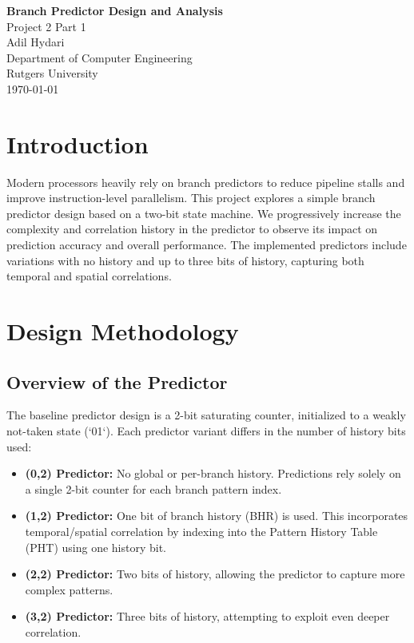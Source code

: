 \documentclass[12pt,letterpaper]{article}
\begin{document}
	
	\begin{titlepage}
		\centering
		\vspace*{1in}
		{\LARGE \textbf{Branch Predictor Design and Analysis}}\\[1.5cm]
		{\large Project 2 Part 1}\\[0.5cm]
		{\large Adil Hydari}\\[0.5cm]
		{\large Department of Computer Engineering}\\[0.5cm]
		{\large Rutgers University}\\[2cm]
		\vfill
		{\large \today}
	\end{titlepage}
	
	\tableofcontents
	\newpage
	
	\section{Introduction}
	Modern processors heavily rely on branch predictors to reduce pipeline stalls and improve instruction-level parallelism. This project explores a simple branch predictor design based on a two-bit state machine. We progressively increase the complexity and correlation history in the predictor to observe its impact on prediction accuracy and overall performance. The implemented predictors include variations with no history and up to three bits of history, capturing both temporal and spatial correlations.
	
	\section{Design Methodology}
	\subsection{Overview of the Predictor}
	The baseline predictor design is a 2-bit saturating counter, initialized to a weakly not-taken state (`01`). Each predictor variant differs in the number of history bits used:
	\begin{itemize}
		\item \textbf{(0,2) Predictor:} No global or per-branch history. Predictions rely solely on a single 2-bit counter for each branch pattern index.
		\item \textbf{(1,2) Predictor:} One bit of branch history (BHR) is used. This incorporates temporal/spatial correlation by indexing into the Pattern History Table (PHT) using one history bit.
		\item \textbf{(2,2) Predictor:} Two bits of history, allowing the predictor to capture more complex patterns.
		\item \textbf{(3,2) Predictor:} Three bits of history, attempting to exploit even deeper correlation.
	\end{itemize}
	
\end{document}
